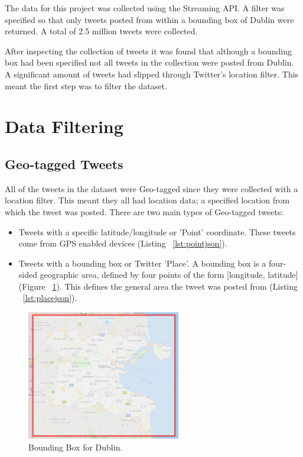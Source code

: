 The data for this project was collected using the Streaming API. A filter was specified so that only tweets posted from within a bounding box of Dublin were returned. A total of 2.5 million tweets were collected.

After inspecting the collection of tweets it was found that although a bounding box had been specified not all tweets in the collection were posted from Dublin. A significant amount of tweets had slipped through Twitter's location filter. This meant the first step was to filter the dataset.

\section{Data Filtering}

\subsection*{Geo-tagged Tweets}

All of the tweets in the dataset were Geo-tagged since they were collected with a location filter. This meant they all had location data; a specified location from which the tweet was posted. There are two main types of Geo-tagged tweets:
\begin{itemize}
    \item Tweets with a specific latitude/longitude or 'Point' coordinate. These tweets come from GPS enabled devices (Listing ~\ref{lst:pointjson}).
    \item Tweets with a bounding box or Twitter 'Place'. A bounding box is a four-sided geographic area, defined by four points of the form [longitude, latitude] (Figure ~\ref{fig:dublinBB}). This defines the general area the tweet was posted from (Listing ~\ref{lst:placejson}).
\end{itemize}

\begin{figure}[h!]
\centering
\includegraphics[width=0.6\textwidth]{design_and_methodology/dublinBB.png}
\caption{\label{fig:dublinBB} Bounding Box for Dublin.}
\end{figure}

